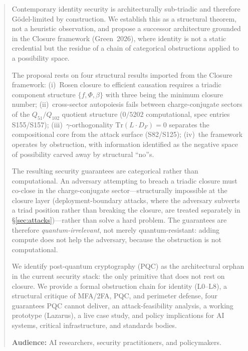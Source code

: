 \documentclass[11pt,a4paper]{article}
\theoremstyle{definition}
\theoremstyle{remark}
\begin{document}
\begin{abstract}
Contemporary identity security is architecturally sub-triadic and therefore G\"odel-limited by construction. We establish this as a structural theorem, not a heuristic observation, and propose a successor architecture grounded in the Closure framework (Green~2026), where identity is not a static credential but the residue of a chain of categorical obstructions applied to a possibility space.

The proposal rests on four structural results imported from the Closure framework: (i)~Rosen closure to efficient causation requires a triadic component structure $\{f, \Phi, \beta\}$ with three being the minimum closure number; (ii)~cross-sector autopoiesis fails between charge-conjugate sectors of the $Q_{51}/Q_{102}$ quotient structure ($0/5202$ computational, spec entries S155/S157); (iii)~$\gamma$-orthogonality $\mathrm{Tr}(L \cdot D_F) = 0$ separates the compositional core from the attack surface (S82/S125); (iv)~the framework operates by obstruction, with information identified as the negative space of possibility carved away by structural ``no''s.

The resulting security guarantees are categorical rather than computational. An adversary attempting to breach a triadic closure must co-close in the charge-conjugate sector---structurally impossible at the closure layer (deployment-boundary attacks, where the adversary subverts a triad position rather than breaking the closure, are treated separately in \S\ref{sec:attacks})---rather than solve a hard problem. The guarantees are therefore \emph{quantum-irrelevant}, not merely quantum-resistant: adding compute does not help the adversary, because the obstruction is not computational.

We identify post-quantum cryptography (PQC) as the architectural orphan in the current security stack: the only primitive that does not rest on closure. We provide a formal obstruction chain for identity (L0--L8), a structural critique of MFA/2FA, PQC, and perimeter defense, four guarantees PQC cannot deliver, an attack-feasibility analysis, a working prototype (Lazarus), a live case study, and policy implications for AI systems, critical infrastructure, and standards bodies.

\textbf{Audience:} AI researchers, security practitioners, and policymakers.
\end{abstract}
\end{document}
